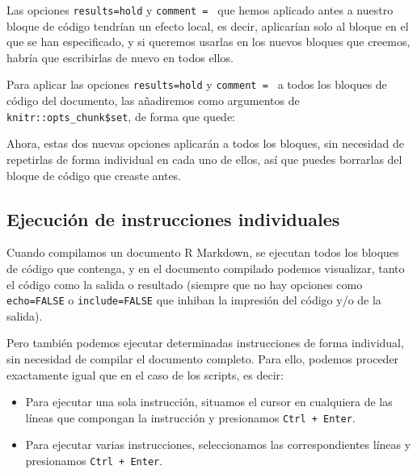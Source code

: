 \documentclass[
  degree=mecinf,
  title=normal,
  toc=normal,
  bib=normal]{mnye}
\newenvironment{Shaded}{\begin{snugshade}}{\end{snugshade}}
\newcommand{\NormalTok}[1]{#1}
\begin{document}
Las opciones \texttt{results=\textquotesingle{}hold\textquotesingle{}} y \texttt{comment\ =\ \textquotesingle{}\textquotesingle{}} que hemos aplicado antes a nuestro bloque de código tendrían un efecto local, es decir, aplicarían solo al bloque en el que se han especificado, y si queremos usarlas en los nuevos bloques que creemos, habría que escribirlas de nuevo en todos ellos.

Para aplicar las opciones \texttt{results=\textquotesingle{}hold\textquotesingle{}} y \texttt{comment\ =\ \textquotesingle{}\textquotesingle{}} a todos los bloques de código del documento, las añadiremos como argumentos de \texttt{knitr::opts\_chunk\$set}, de forma que quede:

\begin{Shaded}
\end{Shaded}

Ahora, estas dos nuevas opciones aplicarán a todos los bloques, sin necesidad de repetirlas de forma individual en cada uno de ellos, así que puedes borrarlas del bloque de código que creaste antes.

\hypertarget{ejecuciuxf3n-de-instrucciones-individuales}{%
\subsection{Ejecución de instrucciones individuales}\label{ejecuciuxf3n-de-instrucciones-individuales}}

Cuando compilamos un documento R Markdown, se ejecutan todos los bloques de código que contenga, y en el documento compilado podemos visualizar, tanto el código como la salida o resultado (siempre que no hay opciones como \texttt{echo=FALSE} o \texttt{include=FALSE} que inhiban la impresión del código y/o de la salida).

Pero también podemos ejecutar determinadas instrucciones de forma individual, sin necesidad de compilar el documento completo.
Para ello, podemos proceder exactamente igual que en el caso de los scripts, es decir:

\begin{itemize}
\item
  Para ejecutar una sola instrucción, situamos el cursor en cualquiera de las líneas que compongan la instrucción y presionamos \texttt{Ctrl\ +\ Enter}.
\item
  Para ejecutar varias instrucciones, seleccionamos las correspondientes líneas y presionamos \texttt{Ctrl\ +\ Enter}.
\end{itemize}
\end{document}
